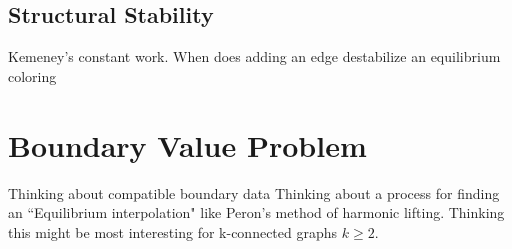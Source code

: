\documentclass[]{article}
\begin{document}
\subsection{Structural Stability}
Kemeney's constant work. When does adding an edge destabilize an equilibrium coloring
\section{Boundary Value Problem}

Thinking about compatible boundary data
Thinking about a process for finding an ``Equilibrium interpolation" like Peron's method of harmonic lifting. 
Thinking this might be most interesting for k-connected graphs $k\geq 2$. 


\end{document}
